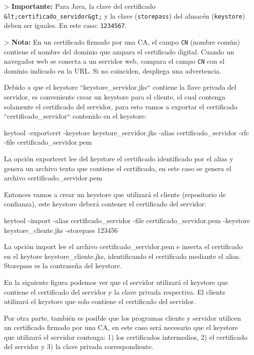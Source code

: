 > \textbf{Importante:} Para Java, la clave del certificado \texttt{\&lt;certificado\_servidor\&gt;} y la clave (\texttt{storepass}) del almacén (\texttt{keystore}) deben ser iguales. En este caso: \texttt{1234567}.

> \textbf{Nota:} En un certificado firmado por una CA, el campo \texttt{CN} (nombre común) contiene el nombre del dominio que ampara el certificado digital. Cuando un navegador web se conecta a un servidor web, compara el campo \texttt{CN} con el dominio indicado en la URL. Si no coinciden, despliega una advertencia.

Debido a que el keystore ``keystore\_servidor.jks`` contiene la llave privada del servidor, es conveniente crear un keystore para el cliente, el cual contenga solamente el certificado del servidor, para esto vamos a exportar el certificado ``certificado\_servidor`` contenido en el keystore:

\begin{SourceCode}
keytool -exportcert -keystore keystore_servidor.jks -alias certificado_servidor -rfc -file certificado_servidor.pem
\end{SourceCode}

La opción exportcert lee del keystore el certificado identificado por el alias y genera un archivo texto que contiene el certificado, en este caso se genera el archivo certificado\_servidor.pem

Entonces vamos a crear un keystore que utilizará el cliente (repositorio de confianza), este keystore deberá contener el certificado del servidor:

\begin{SourceCode}
keytool -import -alias certificado_servidor -file certificado_servidor.pem -keystore keystore_cliente.jks -storepass 123456
\end{SourceCode}

La opción import lee el archivo certificado\_servidor.pem e inserta el certificado en el keytore keystore\_cliente.jks, identificando el certificado mediante el alias. Storepass es la contraseña del keystore.

En la siguiente figura podemos ver que el servidor utilizará el keystore que contiene el certificado del servidor y la clave privada respectiva. El cliente utilizará el keystore que solo contiene el certificado del servidor.

Por otra parte, también es posible que los programas cliente y servidor utilicen un certificado firmado por una CA, en este caso será necesario que el keystore que utilizará el servidor contenga: 1) los certificados intermedios, 2) el certificado del servidor y 3) la clave privada correspondiente.

